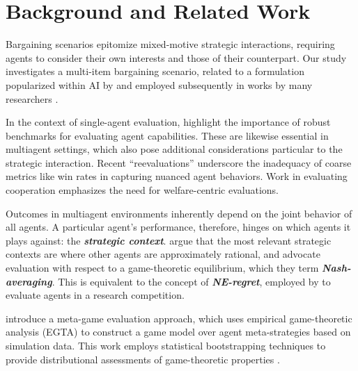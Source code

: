 \documentclass{article}
\theoremstyle{plain}
\theoremstyle{definition}
\theoremstyle{remark}
\newcommand{\term}[1]{\textbf{\textit{#1}}}
\begin{document}
\section{Background and Related Work}

Bargaining scenarios epitomize mixed-motive strategic interactions, requiring agents to consider their own interests and those of their counterpart. 
Our study investigates a multi-item bargaining scenario, related to a formulation popularized within AI by \citet{Lewis17} and employed subsequently in works by many researchers \citep{cao2018emergent,hua2024game,li2024meta,li25combining,lanctot2019openspiel,he-etal-2018-decoupling,chawla-etal-2023-selfish}. 

In the context of single-agent evaluation,  \citet{jordan2020evaluating} highlight the importance of robust benchmarks for evaluating agent capabilities.
These are likewise essential in multiagent settings, which also pose additional considerations particular to the strategic interaction.
Recent ``reevaluations'' \citep{balduzzi2018reevaluating, liu2025reevaluating} underscore the inadequacy of coarse metrics like win rates in capturing nuanced agent behaviors. 
Work in evaluating cooperation \citep{papoudakis2020benchmarking,sinha2019incentivizing}  emphasizes the need for welfare-centric evaluations.

Outcomes in multiagent environments inherently depend on the joint behavior of all agents. 
A particular agent's performance, therefore, hinges on which agents it plays against: the \term{strategic context}.
\citet{balduzzi2018reevaluating} argue that the most relevant strategic contexts are where other agents are approximately rational, and advocate evaluation with respect to a game-theoretic equilibrium, which they term \term{Nash-averaging}.
This is equivalent to the concept of \term{NE-regret}, employed by \citet{jordan2007empirical} to evaluate agents in a research competition.

\citet{li2024meta} introduce a meta-game evaluation approach, which uses empirical game-theoretic analysis (EGTA) \citep{Wellman25tg} to construct a game model over agent meta-strategies based on simulation data.
This work employs statistical bootstrapping techniques \citep{davison1997bootstrap} to provide distributional assessments of game-theoretic properties \citep{wiedenbeck2014bootstrap}.
\end{document}
